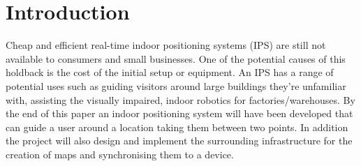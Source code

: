 \section{Introduction }\label{sec:intro}
Cheap and efficient real-time indoor positioning systems (IPS) are still not available to consumers and small businesses. One of the potential causes of this holdback is the cost of the initial setup or equipment. An IPS has a range of potential uses such as guiding visitors around large buildings they're unfamiliar with, assisting the visually impaired, indoor robotics for factories/warehouses. By the end of this paper an indoor positioning system will have been developed that can guide a user around a location taking them between two points. In addition the project will also design and implement the surrounding infrastructure for the creation of maps and synchronising them to a device.